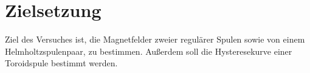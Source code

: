 \section{Zielsetzung}
\label{sec:Ziel}
Ziel des Versuches ist, die Magnetfelder zweier regulärer Spulen sowie von
einem Helmholtzspulenpaar, zu bestimmen. Außerdem soll die Hysteresekurve
einer Toroidspule bestimmt werden.
